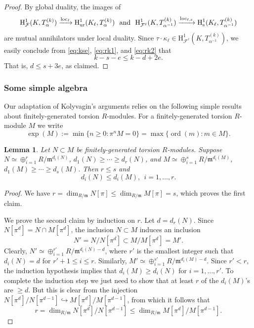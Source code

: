 \documentclass[10pt]{amsart}
\numberwithin{equation}{section}
\newtheorem{lemma}[theorem]{Lemma}
\theoremstyle{definition}
\theoremstyle{remark}
\newcommand{\rH}{\mathrm{H}}
\newcommand{\fm}{\mathfrak{m}}
\DeclareMathOperator{\loc}{loc}
\DeclareMathOperator{\ord}{ord}
\newcommand{\CF}{\mathcal{F}}
\newcommand{\kap}{\kappa}
\begin{document}
\begin{proof}
By global duality, the images of
$$
\rH^1_{\CF}(K,T_{\alpha}^{(k)}) \xrightarrow{\loc_\ell} \rH^1_{\rm ur}(K_\ell, T_{\alpha}^{(k)})
\ \ \text{and} \ \
\rH^1_{\CF^\ell}(K,T_{\alpha^{-1}}^{(k)}) \xrightarrow{\loc_{\ell,\rm{s}}} \rH^1_{\rm s}(K_\ell, T_{\alpha^{-1}}^{(k)})
$$
are mutual annihilators under local duality. 
Since $\tau\cdot \kap_\ell \in \rH^1_{\CF^\ell}(K,T_{\alpha^{-1}}^{(k)})$, we easily conclude from \eqref{eq:kse}, \eqref{eq:rk1}, 
and \eqref{eq:rk2} that
$$
k-s-e \leqslant k-d+2e.
$$
That is, $d \leqslant s+3e$, as claimed.
\end{proof}


\subsubsection{Some simple algebra} Our adaptation of Kolyvagin's arguments 
relies on the following simple results about finitely-generated torsion $R$-modules. 
For a finitely-generated torsion $R$-module $M$ we write 
\begin{displaymath}
\exp(M):=\min\{n\geqslant 0: \pi^n M=0\} = \max\{\ord(m) : m\in M\}.
\end{displaymath}

\begin{lemma}\label{lem:key0}
Let $N\subset M$ be finitely-generated torsion $R$-modules. 
Suppose $N \simeq \oplus_{i=1}^r R/\fm^{d_i(N)}$, $d_1(N)\geqslant \cdots \geqslant d_r(N)$,
and $M\simeq\oplus_{i=1}^s R/\fm^{d_i(M)}$, $d_1(M)\geqslant \cdots \geqslant d_s(M)$.
Then $r\leqslant s$ and
\[
d_i(N) \leqslant d_i(M), \ \ i=1,\dots,r.
\]
\end{lemma}

\begin{proof}
We have $r = \dim_{R/\fm} N[\pi] \leqslant \dim_{R/\fm} M[\pi] = s$,
which proves the first claim.

We prove the second claim by induction on $r$.
Let $d = d_r(N)$. Since $N[\pi^d] = N \cap M[\pi^d]$, the inclusion $N\subset M$
induces an inclusion 
$$
N' = N/N[\pi^d] \subset M/M[\pi^d] = M'.
$$
Clearly, $N' \simeq \oplus_{i=1}^{r'} R/\fm^{d_i(N)-d}$, where 
$r'$ is the smallest integer such that $d_i(N) = d$ for $r'+1\leqslant i \leqslant r$.
Similarly, $M'\simeq \oplus_{i=1}^{s'} R/\fm^{d_i(M)-d}$. 
Since $r'<r$, the induction hypothesis implies that
$d_i(M)\geqslant d_i(N)$ for $i=1,\dots,r'$.
To complete the induction step we just need to show that at least
$r$ of the $d_i(M)$'s are $\geqslant d$. But this is clear from the injection
$N[\pi^d]/N[\pi^{d-1}] \hookrightarrow  M[\pi^d]/M[\pi^{d-1}]$,
from which it follows that
$$
r = \dim_{R/\fm} N[\pi^d]/N[\pi^{d-1}] \leqslant \dim_{R/\fm} M[\pi^d]/M[\pi^{d-1}].
$$
\end{proof}
\end{document}
